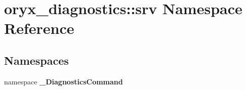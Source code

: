 \section{oryx\-\_\-diagnostics\-:\-:srv \-Namespace \-Reference}
\label{namespaceoryx__diagnostics_1_1srv}
\subsection*{\-Namespaces}
\begin{DoxyCompactItemize}
\item 
namespace {\bf \-\_\-\-Diagnostics\-Command}
\end{DoxyCompactItemize}
